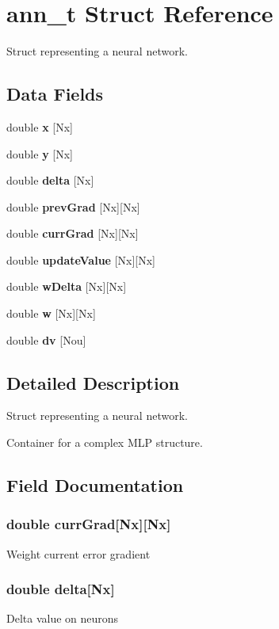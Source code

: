 \section{ann\+\_\+t Struct Reference}
\label{a00001}


Struct representing a neural network.  


\subsection*{Data Fields}
\begin{DoxyCompactItemize}
\item 
double {\bf x} [Nx]
\item 
double {\bf y} [Nx]
\item 
double {\bf delta} [Nx]
\item 
double {\bf prev\+Grad} [Nx][Nx]
\item 
double {\bf curr\+Grad} [Nx][Nx]
\item 
double {\bf update\+Value} [Nx][Nx]
\item 
double {\bf w\+Delta} [Nx][Nx]
\item 
double {\bf w} [Nx][Nx]
\item 
double {\bf dv} [Nou]
\end{DoxyCompactItemize}


\subsection{Detailed Description}
Struct representing a neural network. 

Container for a complex M\+L\+P structure. 

\subsection{Field Documentation}
\subsubsection[{curr\+Grad}]{\setlength{\rightskip}{0pt plus 5cm}double curr\+Grad[Nx][Nx]}\label{a00001_ad634fb273a77c89ef50752fe62499b4f}
Weight current error gradient 
\subsubsection[{delta}]{\setlength{\rightskip}{0pt plus 5cm}double delta[Nx]}\label{a00001_a610000125df6a3004a1a0768bee350be}
Delta value on neurons 
